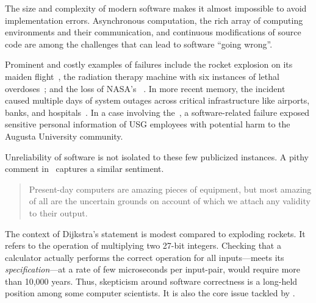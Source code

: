 The size and complexity of modern software makes it almost impossible to avoid
implementation errors. Asynchronous computation, the rich array of computing
environments and their communication, and continuous modifications of source
code are among the challenges that can lead to software \enquote{going wrong}.

Prominent and costly examples of failures include the  rocket
explosion on its maiden flight~\cite{ariane5}, the  radiation
therapy machine with six instances of lethal overdoses~\cite{leveson1993}; and
the loss of NASA's ~\cite{mars1999}. In more recent
memory, the  incident caused multiple days of system outages
across critical infrastructure like airports, banks, and
hospitals~\cite{crowdstrike}. In a case involving the~\textcite{usg2024}, a
software-related failure exposed sensitive personal information of USG employees
with potential harm to the Augusta University community.

Unreliability of software is not isolated to these few publicized instances.
A pithy comment in~\textcite[p. 3]{dijkstra1970} captures a similar sentiment.

\begin{quotation}
\noindent{}Present-day computers are amazing pieces of equipment, but most
amazing of all are the uncertain grounds on account of which we attach any
validity to their output.
\end{quotation}

The context of Dijkstra's statement is modest compared to exploding rockets. It
refers to the operation of multiplying two 27-bit integers. Checking that a
calculator actually performs the correct operation for all inputs---\ie meets
its \emph{specification}---at a rate of few microseconds
per input-pair, would require more than 10,000 years. Thus, skepticism around
software correctness is a long-held position among some computer scientists. It
is also the core issue tackled by .

